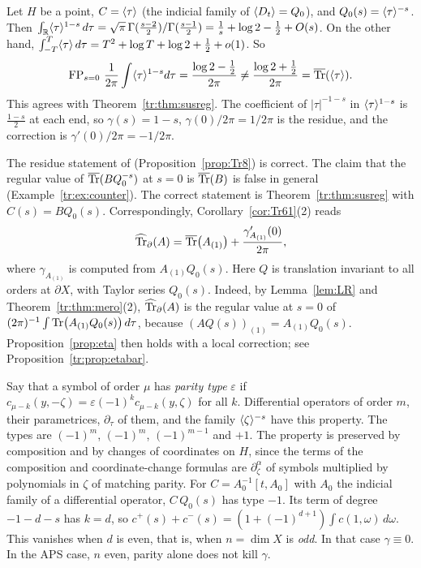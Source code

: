 \begin{example}[\(\FP\ne\bTr\)]\label{tr:ex:counter}
Let \(H\) be a point, \(C=\langle \tau\rangle\) (the indicial family of
\(\langle D_t\rangle=Q_0\)), and \(Q_0(s)=\langle \tau\rangle^{-s}\). Then
\(\int_\mathbb R\langle \tau\rangle^{1-s}\,d\tau=\sqrt\pi\,\Gamma(\frac{s-2}2)/
\Gamma(\frac{s-1}2)=\frac1s+\log2-\frac12+O(s)\). On the other hand,
\(\int_{-T}^T\langle \tau\rangle\,d\tau=T^2+\log T+\log2+\frac12+o(1)\). So
\[
 \operatorname{FP}_{s=0}\,\frac1{2\pi}\int\langle \tau\rangle^{1-s}d\tau=\frac{\log2-\frac12}{2\pi}
 \ne\frac{\log2+\frac12}{2\pi}=\overline{\operatorname{Tr}}(\langle \tau\rangle).
\]
This agrees with Theorem~\ref{tr:thm:susreg}. The coefficient of
\(|\tau|^{-1-s}\) in \(\langle \tau\rangle^{1-s}\) is \(\frac{1-s}2\) at each end,
so \(\gamma(s)=1-s\), \(\gamma(0)/2\pi=1/2\pi\) is the residue, and the
correction is \(\gamma'(0)/2\pi=-1/2\pi\).
\end{example}

\begin{correction}
\label{tr:corr:Prop8}
The residue statement of \cite[Prop.~8]{MN}
(Proposition~\ref{prop:Tr8}) is correct. The claim that the regular value
of \(\overline{\operatorname{Tr}}(BQ_0^{-s})\) at \(s=0\) is \(\overline{\operatorname{Tr}}(B)\) is false in general
(Example~\ref{tr:ex:counter}). The correct statement is
Theorem~\ref{tr:thm:susreg} with \(C(s)=BQ_0(s)\). Correspondingly,
Corollary~\ref{cor:Tr61}(2) reads
\[
 \widehat{\operatorname{Tr}}_\partial(A)=\overline{\operatorname{Tr}}\bigl(A_{(1)}\bigr)+\frac{\gamma_{A_{(1)}}'(0)}{2\pi},
\]
where \(\gamma_{A_{(1)}}\) is computed from \(A_{(1)}Q_0(s)\). Here \(Q\)
is translation invariant to all orders at \(\partial X\), with Taylor series
\(Q_0(s)\). Indeed, by Lemma~\ref{lem:LR} and
Theorem~\ref{tr:thm:mero}(2), \(\widehat{\operatorname{Tr}}_\partial(A)\) is the regular value at \(s=0\)
of \((2\pi)^{-1}\int\operatorname{Tr}\bigl(A_{(1)}Q_0(s)\bigr)\,d\tau\), because
\((AQ(s))_{(1)}=A_{(1)}Q_0(s)\). Proposition~\ref{prop:eta} then holds with
a local correction; see Proposition~\ref{tr:prop:etabar}.
\end{correction}

\begin{remark}\label{tr:rem:parity}
Say that a symbol of order \(\mu\) has \emph{parity type} \(\varepsilon\) if
\(c_{\mu-k}(y,-\zeta)=\varepsilon(-1)^kc_{\mu-k}(y,\zeta)\) for all \(k\).
Differential operators of order \(m\), their parametrices, \(\partial_\tau\)
of them, and the family \(\langle \zeta\rangle^{-s}\) have this property. The types
are \((-1)^m\), \((-1)^m\), \((-1)^{m-1}\) and \(+1\). The property is
preserved by composition and by changes of coordinates on \(H\), since the
terms of the composition and coordinate-change formulas are
\(\partial_\zeta^\alpha\) of symbols multiplied by polynomials in \(\zeta\)
of matching parity. For \(C=A_0^{-1}[t,A_0]\) with \(A_0\) the indicial
family of a differential operator, \(C\,Q_0(s)\) has type \(-1\). Its term
of degree \(-1-d-s\) has \(k=d\), so
\(c^+(s)+c^-(s)=(1+(-1)^{d+1})\int c(1,\omega)\,d\omega\). This vanishes
when \(d\) is even, that is, when \(n=\dim X\) is \emph{odd}. In that case
\(\gamma\equiv0\). In the APS case, \(n\) even, parity alone does not kill
\(\gamma\).
\end{remark}

